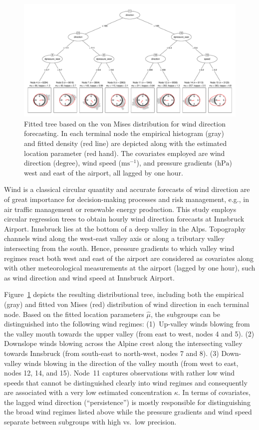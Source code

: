 \documentclass[twoside]{report}
\begin{document}
\begin{figure}[p!]\centering
\includegraphics[height = .5\textheight,angle=90,origin=c]{schlosser-circtree_plot.pdf}
\caption{Fitted tree based on the von Mises distribution for wind direction forecasting.
In each terminal node the empirical histogram (gray) and fitted density (red line)
are depicted along with the estimated location parameter (red hand). The covariates
employed are wind direction ($\text{degree}$), wind speed ($\text{ms}^{-1}$),
and pressure gradients ($\text{hPa}$) west and east of the airport,
all lagged by one hour.}
\label{schlosser:fig_tree} \end{figure}

Wind is a classical circular quantity and accurate forecasts of wind direction
are of great importance for decision-making processes and risk management,
e.g., in air traffic management or renewable energy production. This study
employs circular regression trees to obtain hourly wind direction
forecasts at Innsbruck Airport.
Innsbruck lies at the bottom of a deep valley in the Alps. Topography
channels wind along the west-east valley axis or along a tributary valley
intersecting from the south. Hence, pressure gradients to which valley wind
regimes react both west and east of the airport are considered as covariates
along with other meteorological measurements at the airport (lagged by one hour),
such as wind direction and wind speed at Innsbruck Airport.

Figure~\ref{schlosser:fig_tree} depicts the resulting distributional tree, including
both the empirical (gray) and fitted von Mises (red) distribution of wind direction
in each terminal node. Based on the fitted location parameters $\hat \mu$, the subgroups
can be distinguished into the following wind regimes:
(1)~Up-valley winds blowing from the valley mouth towards the upper valley
(from east to west, nodes 4 and 5). (2) Downslope winds blowing across
the Alpine crest along the intersecting valley towards Innsbruck (from south-east to
north-west, nodes 7 and 8). (3) Down-valley winds blowing in the direction
of the valley mouth (from west to east, nodes 12, 14, and 15). Node~11
captures observations with rather low wind speeds that cannot be distinguished
clearly into wind regimes and consequently are associated with a very low
estimated concentration $\hat \kappa$. In terms of covariates, the lagged
wind direction (``persistence'') is mostly responsible for distinguishing
the broad wind regimes listed above while the pressure gradients and wind
speed separate between subgroups with high vs.\ low precision.
\end{document}
